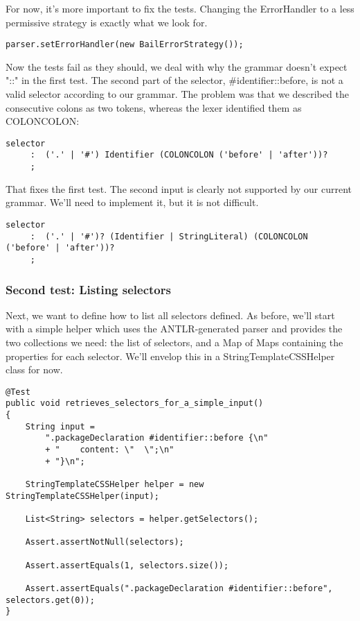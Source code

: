 \documentclass[11pt]{article}
\begin{document}
For now, it's more important to fix the tests. Changing the ErrorHandler to a less permissive strategy is exactly what we look for.

\begin{verbatim}
parser.setErrorHandler(new BailErrorStrategy());
\end{verbatim}

Now the tests fail as they should, we deal with why the grammar doesn't expect "::" in the first test. The second part of the selector, \#identifier::before, is not a valid selector according to our grammar.
The problem was that we described the consecutive colons as two tokens, whereas the lexer identified them as COLONCOLON:

\begin{verbatim}
selector
     :	('.' | '#') Identifier (COLONCOLON ('before' | 'after'))?
     ;
\end{verbatim}

That fixes the first test. The second input is clearly not supported by our current grammar. We'll need to implement it, but it is not difficult.

\begin{verbatim}
selector
     :	('.' | '#')? (Identifier | StringLiteral) (COLONCOLON ('before' | 'after'))?
     ;
\end{verbatim}

\subsubsection{Second test: Listing selectors}
\label{sec-1-4-3}

Next, we want to define how to list all selectors defined. As before, we'll start with a simple helper which uses
the ANTLR-generated parser and provides the two collections we need: the list of selectors, and a Map of Maps containing the properties for each selector.
We'll envelop this in a StringTemplateCSSHelper class for now.

\begin{verbatim}
@Test
public void retrieves_selectors_for_a_simple_input()
{
    String input =
        ".packageDeclaration #identifier::before {\n"
        + "    content: \"  \";\n"
        + "}\n";

    StringTemplateCSSHelper helper = new StringTemplateCSSHelper(input);

    List<String> selectors = helper.getSelectors();

    Assert.assertNotNull(selectors);

    Assert.assertEquals(1, selectors.size());

    Assert.assertEquals(".packageDeclaration #identifier::before", selectors.get(0));
}
\end{verbatim}
\end{document}
